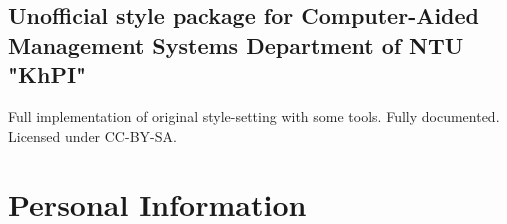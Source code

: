 \documentclass[11pt,a4paper,sans]{moderncv}        %
\begin{document}
\subsection{Unofficial \LaTeXe{} style package for Computer-Aided Management Systems Department of NTU "KhPI"~\href{https://github.com/Livich/stvuz\_KhPI\_XeLaTeX}{\githubsocialsymbol}}
Full implementation of original style-setting with some tools. Fully documented. Licensed under CC-BY-SA.


\section{Personal Information}
\end{document}
